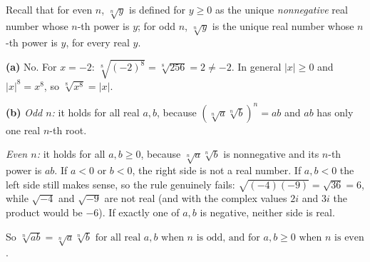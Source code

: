 Recall that for even $n$, $\sqrt[n]{y}$ is defined for $y\ge0$ as the unique \emph{nonnegative} real number whose $n$-th power is $y$; for odd $n$, $\sqrt[n]{y}$ is the unique real number whose $n$-th power is $y$, for every real $y$.

\textbf{(a)} No. For $x=-2$: $\sqrt[8]{(-2)^8}=\sqrt[8]{256}=2\ne-2$. In general $|x|\ge0$ and $|x|^8=x^8$, so $\sqrt[8]{x^8}=\boxed{|x|}$.

\textbf{(b)} \emph{Odd $n$:} it holds for all real $a,b$, because $\left(\sqrt[n]a\sqrt[n]b\right)^n=ab$ and $ab$ has only one real $n$-th root.

\emph{Even $n$:} it holds for all $a,b\ge0$, because $\sqrt[n]a\sqrt[n]b$ is nonnegative and its $n$-th power is $ab$. If $a<0$ or $b<0$, the right side is not a real number. If $a,b<0$ the left side still makes sense, so the rule genuinely fails: $\sqrt{(-4)(-9)}=\sqrt{36}=6$, while $\sqrt{-4}$ and $\sqrt{-9}$ are not real (and with the complex values $2i$ and $3i$ the product would be $-6$). If exactly one of $a,b$ is negative, neither side is real.

So $\boxed{\sqrt[n]{ab}=\sqrt[n]a\sqrt[n]b\text{ for all real }a,b\text{ when }n\text{ is odd, and for }a,b\ge0\text{ when }n\text{ is even}}$.
